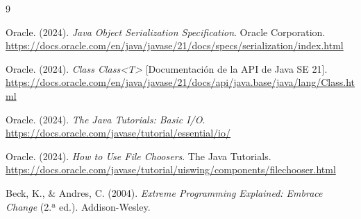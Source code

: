 \documentclass[11pt,letterpaper]{article}
\begin{document}
\begin{thebibliography}{9}
\setlength{\itemsep}{0.3em}

Oracle. (2024). \textit{Java Object Serialization Specification}. Oracle Corporation. \url{https://docs.oracle.com/en/java/javase/21/docs/specs/serialization/index.html}

Oracle. (2024). \textit{Class Class<T>} [Documentación de la API de Java SE 21]. \url{https://docs.oracle.com/en/java/javase/21/docs/api/java.base/java/lang/Class.html}

Oracle. (2024). \textit{The Java Tutorials: Basic I/O}. \url{https://docs.oracle.com/javase/tutorial/essential/io/}

Oracle. (2024). \textit{How to Use File Choosers}. The Java Tutorials. \url{https://docs.oracle.com/javase/tutorial/uiswing/components/filechooser.html}

Beck, K., \& Andres, C. (2004). \textit{Extreme Programming Explained: Embrace Change} (2.ª ed.). Addison-Wesley.

\end{thebibliography}
\end{document}
